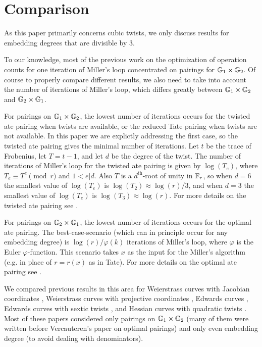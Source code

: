 \section{Comparison}
\label{sec:cmp}

As this paper primarily concerns cubic twists, 
we only discuss results for embedding degrees that are divisible by 3.

To our knowledge, most of the previous work
on the optimization of operation counts for one iteration of Miller's loop
concentrated on pairings for $\mathbb{G}_{1} \times \mathbb{G}_{2}$. 
Of course to properly compare different results, we also need to take
into account the number of iterations of Miller's loop, which differs
greatly between $\mathbb{G}_{1} \times \mathbb{G}_{2}$ and $\mathbb{G}_{2} \times \mathbb{G}_{1}$.

For pairings on $\mathbb{G}_{1} \times \mathbb{G}_{2}$, the lowest number of iterations occurs for the twisted ate pairing when twists are available, or the reduced Tate pairing when twists are not available.
In this paper we are explictly addressing the first case, so the twisted ate pairing gives the minimal number of iterations. 
Let $t$ be the trace of Frobenius, let $T = t-1$, and let $d$ be the degree of the twist. The number of iterations of Miller's loop for the twisted ate pairing is given by $\log(T_e)$, where
$T_e \equiv T^e \pmod{r}$ and $1 < e | d$. 
Also $T$ is a $d^{\text{th}}$-root of unity in $\mathbb{F}_{r}$, so when $d = 6$ the smallest value of
$\log(T_e)$ is $\log(T_2) \approx \log(r)/3$, and when $d = 3$ the smallest value of $\log(T_e)$ is
$\log(T_3) \approx \log(r)$. For more details on the twisted ate pairing see \cite{2006/hess}.

For pairings on $\mathbb{G}_{2} \times \mathbb{G}_{1}$, the lowest number of iterations occurs for the optimal ate pairing. The best-case-scenario (which can in principle occur for any embedding degree) is $\log(r)/\varphi(k)$ iterations of Miller's loop, where $\varphi$ is the Euler $\varphi$-function. This scenario takes $x$ as the input for the Miller's algorithm (e.g. in place of $r = r(x)$ as in Tate). For more details on the optimal ate pairing see \cite{2010/vercauteren}. 

We compared previous results in this area for 
Weierstrass curves with Jacobian coordinates \cite{2008/IonicaJoux08} \cite{2009/fastertate},
Weierstrass curves with projective coordinates \cite{2009/craig},
Edwards curves \cite{2009/fastertate},
Edwards curves with sextic twists \cite{2014/LWZ},
and Hessian curves with quadratic twists \cite{2010/Gu}.
Most of these papers considered only pairings on $\mathbb{G}_{1} \times \mathbb{G}_{2}$ 
(many of them were written before Vercauteren's paper on optimal pairings)
and only even embedding degree (to avoid dealing with denominators).


